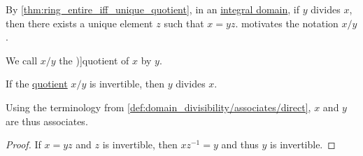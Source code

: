 \begin{definition}\label{def:domain_quotient}\mimprovised
  By \cref{thm:ring_entire_iff_unique_quotient}, in an \hyperref[def:integral_domain]{integral domain}, if \( y \) divides \( x \), then there exists a unique element \( z \) such that \( x = yz \).  motivates the notation \( x / y \).

  We call \( x / y \) the \term[ru=частное/отношение (\cite[16]{Винберг2014КурсАлгебры})]{quotient} of \( x \) by \( y \).
\end{definition}

\begin{proposition}\label{thm:domain_quotient_inverse}
  If the \hyperref[def:domain_quotient]{quotient} \( x / y \) is invertible, then \( y \) divides \( x \).
\end{proposition}
\begin{comments}
  \item Using the terminology from \cref{def:domain_divisibility/associates/direct}, \( x \) and \( y \) are thus associates.
\end{comments}
\begin{proof}
  If \( x = yz \) and \( z \) is invertible, then \( x z^{-1} = y \) and thus \( y \) is invertible.
\end{proof}

